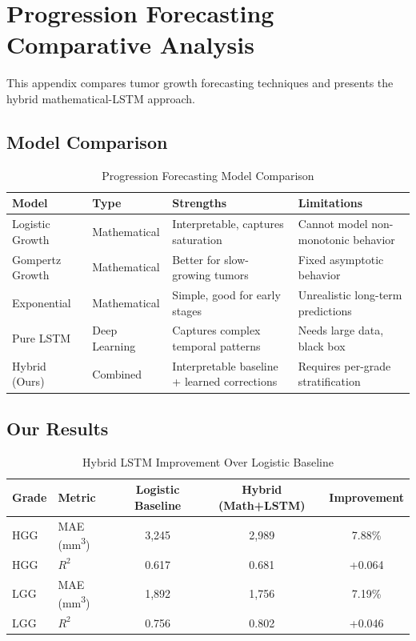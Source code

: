 \chapter{Progression Forecasting Comparative Analysis}
\label{app:c}

This appendix compares tumor growth forecasting techniques and presents the hybrid mathematical-LSTM approach.

\section{Model Comparison}

\begin{table}[H]
\centering
\caption{Progression Forecasting Model Comparison}
\label{tab:prog_compare}
\begin{tabular}{p{3cm}p{2.5cm}p{3.5cm}p{3.5cm}}
\toprule
\textbf{Model} & \textbf{Type} & \textbf{Strengths} & \textbf{Limitations} \\
\midrule
Logistic Growth   & Mathematical & Interpretable, captures saturation & Cannot model non-monotonic behavior \\
Gompertz Growth   & Mathematical & Better for slow-growing tumors     & Fixed asymptotic behavior \\
Exponential       & Mathematical & Simple, good for early stages       & Unrealistic long-term predictions \\
Pure LSTM         & Deep Learning & Captures complex temporal patterns  & Needs large data, black box \\
Hybrid (Ours)     & Combined     & Interpretable baseline + learned corrections & Requires per-grade stratification \\
\bottomrule
\end{tabular}
\end{table}

\section{Our Results}

\begin{table}[H]
\centering
\caption{Hybrid LSTM Improvement Over Logistic Baseline}
\label{tab:prog_results}
\begin{tabular}{llccc}
\toprule
\textbf{Grade} & \textbf{Metric} & \textbf{Logistic Baseline} & \textbf{Hybrid (Math+LSTM)} & \textbf{Improvement} \\
\midrule
HGG & MAE (mm\textsuperscript{3})  & 3,245 & 2,989 & 7.88\% \\
HGG & $R^2$                        & 0.617 & 0.681 & +0.064 \\
LGG & MAE (mm\textsuperscript{3})  & 1,892 & 1,756 & 7.19\% \\
LGG & $R^2$                        & 0.756 & 0.802 & +0.046 \\
\bottomrule
\end{tabular}
\end{table}

